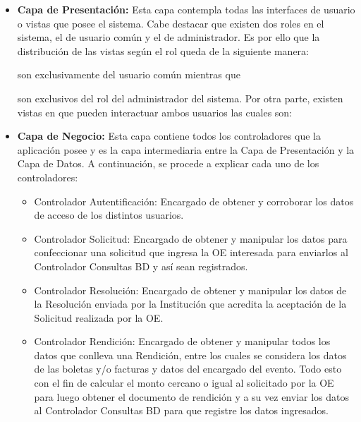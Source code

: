 \begin{itemize}
    \item \textbf{Capa de Presentación: } Esta capa contempla todas las interfaces de usuario o vistas que posee el sistema. Cabe destacar que existen dos roles en el sistema, el de usuario común y el de administrador. Es por ello que la distribución de las vistas según el rol queda de la siguiente manera:
      son exclusivamente del usuario común mientras que 
      son exclusivos del rol del administrador del sistema. Por otra parte, existen vistas en que pueden interactuar ambos usuarios las cuales son: 
    \item \textbf{Capa de Negocio: }Esta capa contiene todos los controladores que la aplicación posee y es la capa intermediaria entre la Capa de Presentación y la Capa de Datos. A continuación, se procede a explicar cada uno de los controladores:
        \begin{itemize}
            \item Controlador Autentificación: Encargado de obtener y corroborar los datos de acceso de los distintos usuarios.
            \item Controlador Solicitud: Encargado de obtener y manipular los datos para confeccionar una solicitud que ingresa la OE interesada para enviarlos al Controlador Consultas BD y así sean registrados.
            \item Controlador Resolución: Encargado de obtener y manipular los datos de la Resolución enviada por la Institución que acredita la aceptación de la Solicitud realizada por la OE.
            \item Controlador Rendición: Encargado de obtener y manipular todos los datos que conlleva una Rendición, entre los cuales se considera los datos de las boletas y/o facturas y datos del encargado del evento. Todo esto con el fin de calcular el monto cercano o igual al solicitado por la OE para luego obtener el documento de rendición y a su vez enviar los datos al Controlador Consultas BD para que registre los datos ingresados.

\end{itemize}
\end{itemize}
